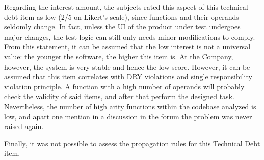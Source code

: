    Regarding the interest amount, the subjects rated this aspect of this technical debt item as low (2/5 on Likert's scale), since functions and their operands seldomly change. In fact, unless the UI of the product under test undergoes major changes, the test logic can still only needs minor modifications to comply. From this statement, it can be assumed that the low interest is not a universal value: the younger the software, the higher this item is. At the Company, however, the system is very stable and hence the low score. However, it can be assumed that this item correlates with DRY violations and single responsibility violation principle. A function with a high number of operands will probably check the validity of said items, and after that perform the designed task. Nevertheless, the number of high arity functions within the codebase analyzed is low, and apart one mention in a discussion in the forum the problem was never raised again.
    
    Finally, it was not possible to assess the propagation rules for this Technical Debt item.




